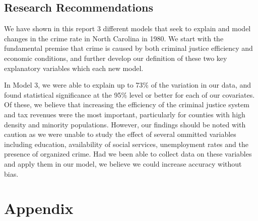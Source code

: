 \documentclass[]{article}
\begin{document}
\hypertarget{research-recommendations}{%
\subsection{Research Recommendations}\label{research-recommendations}}

We have shown in this report 3 different models that seek to explain and
model changes in the crime rate in North Carolina in 1980. We start with
the fundamental premise that crime is caused by both criminal justice
efficiency and economic conditions, and further develop our definition
of these two key explanatory variables which each new model.

In Model 3, we were able to explain up to 73\% of the variation in our
data, and found statistical significance at the 95\% level or better for
each of our covariates. Of these, we believe that increasing the
efficiency of the criminal justice system and tax revenues were the most
important, particularly for counties with high density and minority
populations. However, our findings should be noted with caution as we
were unable to study the effect of several ommitted variables including
education, availability of social services, unemployment rates and the
presence of organized crime. Had we been able to collect data on these
variables and apply them in our model, we believe we could increase
accuracy without bias.

\hypertarget{appendix}{%
\section{Appendix}\label{appendix}}
\end{document}
